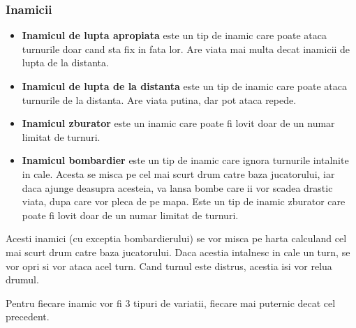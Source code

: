 \documentclass[12pt, a4paper]{article}
\begin{document}
	
	
	\subsubsection{Inamicii}
	\begin{itemize}
		\item \textbf{Inamicul de lupta apropiata} este un tip de inamic care poate ataca turnurile doar cand sta fix in fata lor. Are viata mai multa decat inamicii de lupta de la distanta.
		\item \textbf{Inamicul de lupta de la distanta} este un tip de inamic care poate ataca turnurile de la distanta. Are viata putina, dar pot ataca repede.
		\item \textbf{Inamicul zburator} este un inamic care poate fi lovit doar de un numar limitat de turnuri.
		\item \textbf{Inamicul bombardier} este un tip de inamic care ignora turnurile intalnite in cale. Acesta se misca pe cel mai scurt drum catre baza jucatorului, iar daca ajunge deasupra acesteia, va lansa bombe care ii vor scadea drastic viata, dupa care vor pleca de pe mapa. Este un tip de inamic zburator care poate fi lovit doar de un numar limitat de turnuri.
	\end{itemize}

	Acesti inamici (cu exceptia bombardierului) se vor misca pe harta calculand cel mai scurt drum catre baza jucatorului. Daca acestia intalnesc in cale un turn, se vor opri si vor ataca acel turn. Cand turnul este distrus, acestia isi vor relua drumul.
	
	Pentru fiecare inamic vor fi 3 tipuri de variatii, fiecare mai puternic decat cel precedent.
	
	
	
\end{document}
